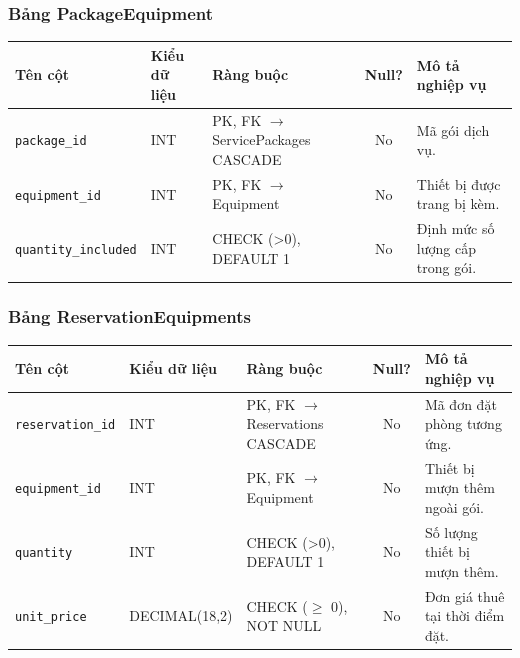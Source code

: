 \subsubsection{Bảng PackageEquipment}
\begin{table}[H]
\centering
\small
\begin{tabularx}{\textwidth}{l l l c X}
\toprule
\textbf{Tên cột} & \textbf{Kiểu dữ liệu} & \textbf{Ràng buộc} & \textbf{Null?} & \textbf{Mô tả nghiệp vụ} \\
\midrule
\texttt{package\_id} & INT & PK, FK $\rightarrow$ ServicePackages CASCADE & No & Mã gói dịch vụ. \\
\texttt{equipment\_id} & INT & PK, FK $\rightarrow$ Equipment & No & Thiết bị được trang bị kèm. \\
\texttt{quantity\_included}& INT & CHECK (>0), DEFAULT 1 & No & Định mức số lượng cấp trong gói. \\
\bottomrule
\end{tabularx}
\end{table}

\subsubsection{Bảng ReservationEquipments}
\begin{table}[H]
\centering
\small
\begin{tabularx}{\textwidth}{l l l c X}
\toprule
\textbf{Tên cột} & \textbf{Kiểu dữ liệu} & \textbf{Ràng buộc} & \textbf{Null?} & \textbf{Mô tả nghiệp vụ} \\
\midrule
\texttt{reservation\_id}& INT & PK, FK $\rightarrow$ Reservations CASCADE & No & Mã đơn đặt phòng tương ứng. \\
\texttt{equipment\_id} & INT & PK, FK $\rightarrow$ Equipment & No & Thiết bị mượn thêm ngoài gói. \\
\texttt{quantity} & INT & CHECK (>0), DEFAULT 1 & No & Số lượng thiết bị mượn thêm. \\
\texttt{unit\_price} & DECIMAL(18,2) & CHECK ($\ge$ 0), NOT NULL & No & Đơn giá thuê tại thời điểm đặt. \\
\bottomrule
\end{tabularx}
\end{table}


